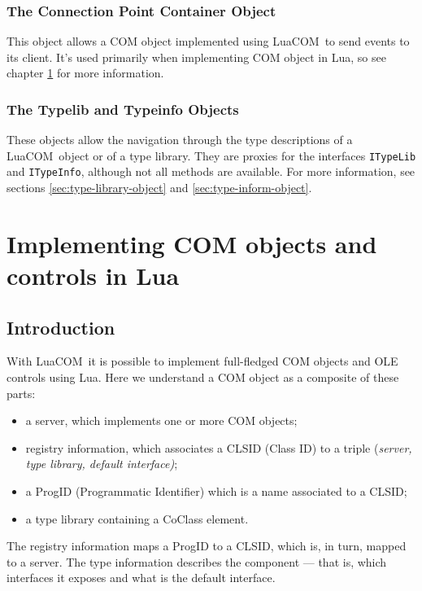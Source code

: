 \documentclass[11pt,a4paper,english]{report}
\newcommand{\ident}[1]{\mbox{\texttt{#1}}}
\newcommand{\techname}[1]{\mbox{#1}}
\newcommand{\luacom}{\techname{LuaCOM}}
\begin{document}
\subsection{The Connection Point Container Object}

This object allows a COM object implemented using \luacom\ to send
events to its client. It's used primarily when implementing COM object
in Lua, so see chapter \ref{sec:impl-com-objects} for more
information.

\subsection{The Typelib and Typeinfo Objects}
These objects allow the navigation through the type descriptions of a
\luacom\ object or of a type library. They are proxies for the
interfaces \ident{ITypeLib} and \ident{ITypeInfo}, although not all
methods are available. For more information, see sections
\ref{sec:type-library-object} and \ref{sec:type-inform-object}.





\chapter{Implementing COM objects and controls in Lua}
\label{sec:impl-com-objects}

\section{Introduction}
With \luacom\ it is possible to implement full-fledged COM objects
and OLE controls using Lua. Here we understand a COM object as a
composite of these parts:

\begin{itemize}
\item a server, which implements one or more COM objects;
\item registry information, which associates a CLSID (Class ID) to
a triple (\emph{server, type library, default interface)};
\item a ProgID (Programmatic Identifier) which is a name associated to
a CLSID;
\item a type library containing a CoClass element.
\end{itemize}

The registry information maps a ProgID to a CLSID, which is, in
turn, mapped to a server. The type information describes the
component --- that is, which interfaces it exposes and what is the
default interface.
\end{document}
